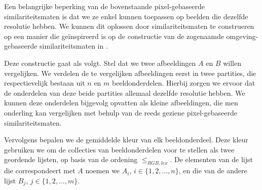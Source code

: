 Een belangrijke beperking van de bovenstaande pixel-gebaseerde similariteitsmaten is dat we
ze enkel kunnen toepassen op beelden die dezelfde resolutie hebben. We kunnen dit oplossen
door similariteitsmaten te construeren op een manier die ge\"inspireerd is op de constructie
van de zogenaamde omgeving-gebaseerde similariteitsmaten in \cite{vanderweken:similariteitsmaten}. 

Deze constructie gaat als volgt. Stel dat we twee afbeeldingen $A$ en $B$ willen
vergelijken. We verdelen
de te vergelijken afbeeldingen eerst in twee partities, die respectievelijk bestaan uit
$n$ en $m$ beeldonderdelen. Hierbij zorgen we ervoor dat de onderdelen
van deze beide partities allemaal dezelfde resolutie hebben. We kunnen deze onderdelen bijgevolg 
opvatten als kleine afbeeldingen, die men onderling kan vergelijken met behulp van de reeds 
geziene pixel-gebaseerde similariteitsmaten.

Vervolgens bepalen we de gemiddelde kleur van elk beeldonderdeel. Deze kleur gebruiken we om
de collecties van beeldonderdelen voor te stellen als twee geordende lijsten, op basis
van de ordening $\leq_{RGB,lex}$. De elementen van de lijst die correspondeert met $A$ noemen 
we $A_i$, $i \in \{1,2,\ldots,n\}$, en die van de andere lijst $B_j$, $j \in \{1,2,\ldots,m\}$.

